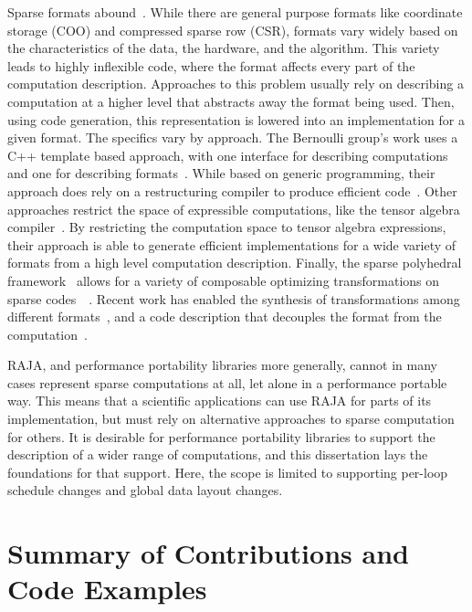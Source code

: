 Sparse formats abound~\cite{langr2015evaluation}. 
While there are general purpose formats like coordinate storage (COO) and compressed sparse row (CSR), formats vary widely based on the characteristics of the data, the hardware, and the algorithm.
This variety leads to highly inflexible code, where the format affects every part of the computation description.
Approaches to this problem usually rely on describing a computation at a higher level that abstracts away the format being used.
Then, using code generation, this representation is lowered into an implementation for a given format.
The specifics vary by approach.
The Bernoulli group's work uses a C++ template based approach, with one interface for describing computations~\cite{kotlyar1997relational} and one for describing formats~\cite{kotlyar1997compiling}.
While based on generic programming, their approach does rely on a restructuring compiler to produce efficient code~\cite{mateev2000bernoulli,ahmed2000framework}.
Other approaches restrict the space of expressible computations, like the tensor algebra compiler~\cite{kjolstad2017tensor}.
By restricting the computation space to tensor algebra expressions, their approach is able to generate efficient implementations for a wide variety of formats from a high level computation description.
Finally, the sparse polyhedral framework~\cite{strout2016approach} allows for a variety of composable optimizing transformations on sparse codes~~\cite{ahmad2017optimizing}.
Recent work has enabled the synthesis of transformations among different formats~\cite{popoola2023code}, and a code description that decouples the format from the computation~\cite{zhao2022polyhedral}.

RAJA, and performance portability libraries more generally, cannot in many cases represent sparse computations at all, let alone in a performance portable way.
This means that a scientific applications can use RAJA for parts of its implementation, but must rely on alternative approaches to sparse computation for others.
It is desirable for performance portability libraries to support the description of a wider range of computations, and this dissertation lays the foundations for that support.
Here, the scope is limited to supporting per-loop schedule changes and global data layout changes.

\section{Summary of Contributions and Code Examples}

